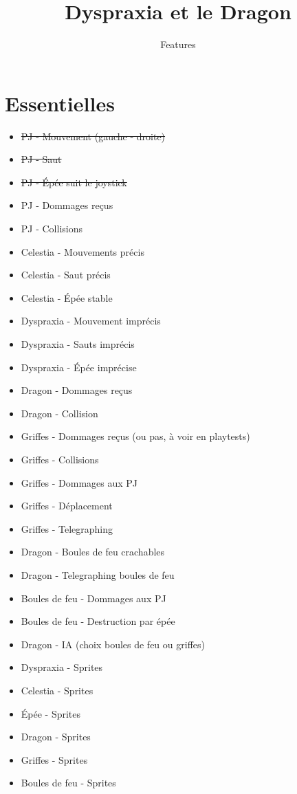 \documentclass{scrartcl}
\title{Dyspraxia et le Dragon}
\subtitle{Features}
\author{}
\date{}
\begin{document}
	\maketitle
	\section{Essentielles}
	\begin{itemize}
		\item \st{PJ - Mouvement (gauche - droite)}
		\item \st{PJ - Saut}
		\item \st{PJ - Épée suit le joystick}
		\item PJ - Dommages reçus
		\item PJ - Collisions
		\item Celestia - Mouvements précis
		\item Celestia - Saut précis
		\item Celestia - Épée stable
		\item Dyspraxia - Mouvement imprécis
		\item Dyspraxia - Sauts imprécis
		\item Dyspraxia - Épée imprécise
		\item Dragon - Dommages reçus
		\item Dragon - Collision
		\item Griffes - Dommages reçus (ou pas, à voir en playtests)
		\item Griffes - Collisions
		\item Griffes - Dommages aux PJ
		\item Griffes - Déplacement
		\item Griffes - Telegraphing
		\item Dragon - Boules de feu crachables
		\item Dragon - Telegraphing boules de feu
		\item Boules de feu - Dommages aux PJ
		\item Boules de feu - Destruction par épée
		\item Dragon - IA (choix boules de feu ou griffes)
		\item Dyspraxia - Sprites
		\item Celestia - Sprites
		\item Épée - Sprites
		\item Dragon - Sprites
		\item Griffes - Sprites
		\item Boules de feu - Sprites
	\end{itemize}
\end{document}

